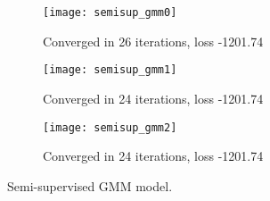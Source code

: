 \begin{answer}
	\begin{figure}[H]
		\centering
		\begin{subfigure}[H]{0.45\linewidth}
			\texttt{[image: semisup\_gmm0]}
			\caption{Converged in 26 iterations, loss -1201.74}
		\end{subfigure}
		\begin{subfigure}[H]{0.45\linewidth}
			\texttt{[image: semisup\_gmm1]}
			\caption{Converged in 24 iterations, loss -1201.74}
		\end{subfigure}
		\begin{subfigure}[H]{0.45\linewidth}
			\texttt{[image: semisup\_gmm2]}
			\caption{Converged in 24 iterations, loss -1201.74}
		\end{subfigure}
		\caption{Semi-supervised GMM model.}
	\end{figure}
\end{answer}
